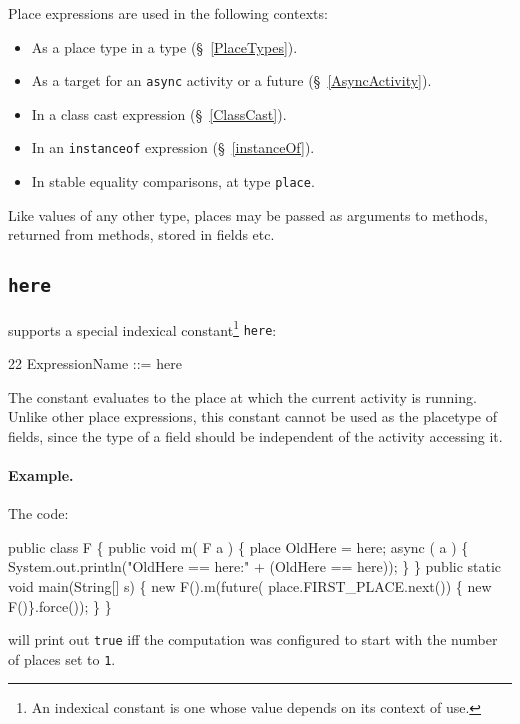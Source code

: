 Place expressions are used in the following contexts: 
\begin{itemize}
\item As a  place type in a type (\S~\ref{PlaceTypes}).
\item As a target for an {\tt async} activity or a future
(\S~\ref{AsyncActivity}).
\item In a class cast expression  (\S~\ref{ClassCast}).
\item In an {\tt instanceof} expression (\S~\ref{instanceOf}).
\item In stable equality comparisons, at type {\tt place}.
\end{itemize}

Like values of any other type, places may be passed as arguments
to methods, returned from methods, stored in fields etc.

\subsection{{\tt here}}\label{Here}
\Xten{} supports a special indexical constant\footnote{
An indexical constant is one whose value depends on its context of use.}
  {\tt here}:
\begin{x10}
22 ExpressionName ::= here
\end{x10}
The constant evaluates to the place at which the current activity is
running. Unlike other place expressions, this constant cannot be 
used as the placetype of fields, since the type of a field 
should be independent of the activity accessing it.

\paragraph{Example.}
The code:
\begin{x10}
public class F \{
   public void m( F a ) \{
     place OldHere = here;
     async ( a ) \{
      System.out.println("OldHere == here:" 
                         + (OldHere == here));
     \}
   \}
  public static void main(String[] s) \{
     new F().m(future( place.FIRST\_PLACE.next())
                \{ new F()\}.force());
  \}
\}  
\end{x10}
\noindent will print out {\tt true} iff the computation was configured
to start with the number of places set to {\tt 1}. 

